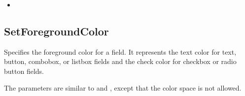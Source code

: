 \documentclass[letterpaper,12pt,english,openany,oneside]{sphinxmanual}
\begin{document}
\label{\detokenize{IAC_API_FormsIntro:related-methods-5}}
\begin{itemize}
\item {} 

\end{itemize}
\label{\detokenize{IAC_API_FormsIntro:example-4}}

\begin{sphinxVerbatim}[commandchars=\\\{\}]
   
  
  
 
\end{sphinxVerbatim}




\subsection{SetForegroundColor}
\label{\detokenize{IAC_API_FormsIntro:setforegroundcolor}}
Specifies the foreground color for a field. It represents the text color for text, button, combobox, or listbox fields and the check color for checkbox or radio button fields.

The parameters are similar to  and , except that the  color space is not allowed.

\label{\detokenize{IAC_API_FormsIntro:syntax-6}}

\begin{sphinxVerbatim}[commandchars=\\\{\}]
           
\end{sphinxVerbatim}
\label{\detokenize{IAC_API_FormsIntro:parameters-6}}
\end{document}
